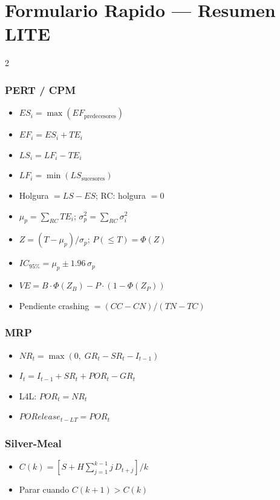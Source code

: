 \documentclass[11pt, a4paper]{article}
\begin{document}
\newpage
\section*{Formulario Rapido --- Resumen LITE}

\begin{multicols}{2}

\subsubsection*{PERT / CPM}
\begin{itemize}[leftmargin=1.2em, itemsep=1pt, label={$\bullet$}]
  \item $ES_i = \max(EF_{\text{predecesores}})$
  \item $EF_i = ES_i + TE_i$
  \item $LS_i = LF_i - TE_i$
  \item $LF_i = \min(LS_{\text{sucesores}})$
  \item Holgura $= LS - ES$; RC: holgura $= 0$
  \item $\mu_p = \sum_{RC} TE_i$; $\sigma_p^2 = \sum_{RC} \sigma_i^2$
  \item $Z = (T - \mu_p)/\sigma_p$; $P(\le T) = \Phi(Z)$
  \item $IC_{95\%} = \mu_p \pm 1.96\,\sigma_p$
  \item $VE = B \cdot \Phi(Z_B) - P\cdot(1-\Phi(Z_P))$
  \item Pendiente crashing $= (CC-CN)/(TN-TC)$
\end{itemize}

\subsubsection*{MRP}
\begin{itemize}[leftmargin=1.2em, itemsep=1pt, label={$\bullet$}]
  \item $NR_t = \max(0,\; GR_t - SR_t - I_{t-1})$
  \item $I_t = I_{t-1} + SR_t + POR_t - GR_t$
  \item L4L: $POR_t = NR_t$
  \item $PORelease_{t-LT} = POR_t$
\end{itemize}

\subsubsection*{Silver-Meal}
\begin{itemize}[leftmargin=1.2em, itemsep=1pt, label={$\bullet$}]
  \item $C(k) = \left[S + H\sum_{j=1}^{k-1} j\,D_{t+j}\right]/k$
  \item Parar cuando $C(k+1) > C(k)$
\end{itemize}


\end{multicols}
\end{document}

